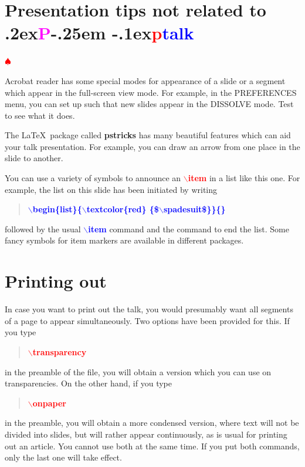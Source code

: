 \documentclass[12pt]{article}
\def\pptalk{{
\raise.2ex\hbox{\textcolor{magenta}P}\kern-.25em
\raise-.1ex\hbox{\textcolor{red}p}\textcolor{blue}{talk}}}
\def\ecomm#1{{\textcolor{blue}{$\backslash${\bf #1}}}}
\def\comm#1{{\textcolor{red}{$\backslash${\bf #1}}}}
\def\file#1{\textcolor{darkpurple}{\bf #1}}
\begin{document}
\endslide





\beginslide

\section{Presentation tips not related to \pptalk}

\begin{list}{\textcolor{red}{$\spadesuit$}}{}

\item Acrobat reader has some special modes for appearance of a slide
  or a segment which appear in the full-screen view mode.  For
  example, in the PREFERENCES menu, you can set up such that new
  slides appear in the DISSOLVE mode.  Test to see what it does.

\item The \LaTeX\ package called \file{pstricks} has many beautiful
  features which can aid your talk presentation.  For example, you can
  draw an arrow from one place in the slide to another.

\item You can use a variety of symbols to announce an \comm{item} in a
  list like this one.  For example, the list on this  slide has been
  initiated by writing
%
\begin{quote}
\ecomm{begin\{list\}\{\ecomm{textcolor}\{red\}%
\{\$\ecomm{spadesuit}\$\}\}\{\}} 
\end{quote}
%
followed by the usual \ecomm{item} command and the command to end the
list.  Some fancy symbols for item markers are available in different
packages.

\end{list}


\endslide


\beginslide
\section{Printing out}
%
In case you want to print out the talk, you would presumably want all
segments of a page to appear simultaneously.  Two options have been
provided for this.  If you type
%
\begin{quote}
\comm{transparency}
\end{quote}
%
in the preamble of the file, you will obtain a version which you can
use on transparencies.  On the other hand, if you type 
%
\begin{quote}
\comm{onpaper}
\end{quote}
%
in the preamble, you will obtain a more condensed version, where text
will not be divided into slides, but will rather appear continuously,
as is usual for printing out an article.  You cannot use both at the
same time.  If you put both commands, only the last one will take
effect. 
\end{document}
